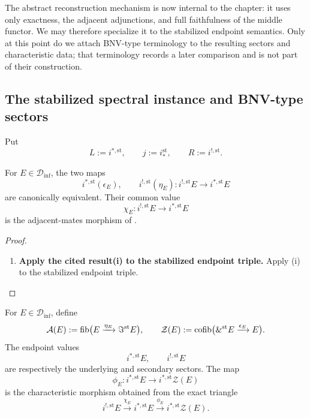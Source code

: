 The abstract reconstruction mechanism is now internal to the chapter: it uses
only exactness, the adjacent adjunctions, and full faithfulness of the middle
functor. We may therefore specialize it to the stabilized endpoint semantics.
Only at this point do we attach BNV-type terminology to the resulting sectors
and characteristic data; that terminology records a later comparison and is
not part of their construction.

\subsection{The stabilized spectral instance and BNV-type sectors}

Put
\[
    L:=i^{*,\mathrm{st}},
    \qquad
    j:=i_*^{\mathrm{st}},
    \qquad
    R:=i^{!,\mathrm{st}}.
\]

\begin{lemma}
\label{lem:stable-bnv-adjacent-mates}
For \(E\in\mathcal D_{\inf}\), the two maps
\[
    i^{*,\mathrm{st}}(\epsilon_E),
    \qquad
    i^{!,\mathrm{st}}(\eta_E):
    i^{!,\mathrm{st}}E\longrightarrow i^{*,\mathrm{st}}E
\]
are canonically equivalent. Their common value
\[
    \chi_E:i^{!,\mathrm{st}}E\longrightarrow i^{*,\mathrm{st}}E
\]
is the adjacent-mates morphism of
.
\end{lemma}

\begin{proof}
\leavevmode
\begin{enumerate}[label=\textup{(\arabic*)}]
    \item \textbf{Apply the cited result(i) to the stabilized endpoint triple.}
    Apply \textup{(i)} to the stabilized endpoint triple.
\end{enumerate}
\end{proof}

\begin{definition}
\label{def:stable-bnv-sectors}
For \(E\in\mathcal D_{\inf}\), define
\[
    \mathcal A(E)
    :=
    \operatorname{fib}\bigl(E\xrightarrow{\eta_E}\Im^{\mathrm{st}}E\bigr),
    \qquad
    \mathcal Z(E)
    :=
    \operatorname{cofib}\bigl(\&^{\mathrm{st}}E\xrightarrow{\epsilon_E}E\bigr).
\]
The endpoint values
\[
    i^{*,\mathrm{st}}E,
    \qquad
    i^{!,\mathrm{st}}E
\]
are respectively the underlying and secondary sectors. The map
\[
    \phi_E:
    i^{*,\mathrm{st}}E
    \longrightarrow
    i^{*,\mathrm{st}}\mathcal Z(E)
\]
is the characteristic morphism obtained from the exact triangle
\[
    i^{!,\mathrm{st}}E
    \xrightarrow{\chi_E}
    i^{*,\mathrm{st}}E
    \xrightarrow{\phi_E}
    i^{*,\mathrm{st}}\mathcal Z(E).
\]
\end{definition}

